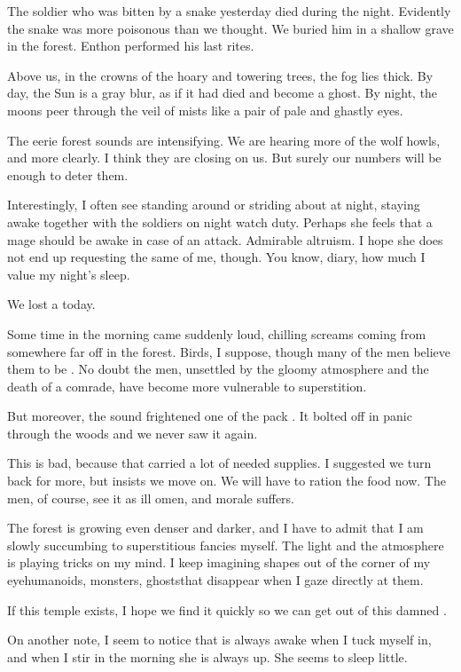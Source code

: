 \begin{diary}%
\diarystamp{\dateWaythaneDayTwo}

\new
%
The soldier who was bitten by a snake yesterday died during the night. 
Evidently the snake was more poisonous than we thought. 
We buried him in a shallow grave in the forest. 
\Frater{} Enthon performed his last rites. 

Above us, in the crowns of the hoary and towering trees, the fog lies thick. 
By day, the Sun is a gray blur, as if it had died and become a ghost. 
By night, the moons peer through the veil of mists like a pair of pale and ghastly eyes. 

The eerie forest sounds are intensifying. 
We are hearing more of the wolf howls, and more clearly. 
I think they are closing on us. 
But surely our numbers will be enough to deter them. 

Interestingly, I often see \Miss{} \Takestsha{} standing around or striding about at night, staying awake together with the soldiers on night watch duty. Perhaps she feels that a mage should be awake in case of an attack. Admirable altruism. I hope she does not end up requesting the same of me, though. You know, diary, how much I value my night's sleep.
\end{diary}







\begin{diary}%
\diarystamp{\dateWaythaneDayThree}

\new
%
We lost a  today. 

Some time in the morning came suddenly loud, chilling screams coming from somewhere far off in the forest. Birds, I suppose, though many of the men believe them to be \daemons. No doubt the men, unsettled by the gloomy atmosphere and the death of a comrade, have become more vulnerable to superstition. 

But moreover, the sound frightened one of the pack \belwans{}. 
It bolted off in panic through the woods and we never saw it again. 

This is bad, because that \belwan{} carried a lot of needed supplies. 
I suggested we turn back for more, but \Miss{} \Takestsha{} insists we move on. 
We will have to ration the food now. The men, of course, see it as ill omen, and morale suffers. 

The forest is growing even denser and darker, and I have to admit that I am slowly succumbing to superstitious fancies myself. The light and the atmosphere is playing tricks on my mind. I keep imagining shapes out of the corner of my eye\dash humanoids, monsters, ghosts\dash that disappear when I gaze directly at them. 

If this temple exists, I hope we find it quickly so we can get out of this damned \Wylde{}.

On another note, I seem to notice that \Takestsha{} is always awake when I tuck myself in, and when I stir in the morning she is always up. 
She seems to sleep little. 
\end{diary}








